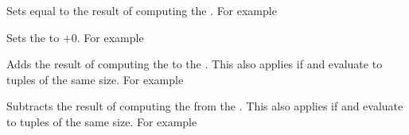 \documentclass[oneside]{book}
\begin{document}
\begin{function}{\FpSet}
\begin{syntax}
  
\end{syntax}
Sets  equal to the result of computing the
. For example
\begin{demohigh}
\FpSet{}
\FpUse\lTmpaFp
\end{demohigh}
\end{function}

\begin{function}{\FpZero}
\begin{syntax}
 
\end{syntax}
Sets the  to $+0$. For example
\begin{demohigh}
\FpSet{}
\FpZero\lTmpaFp
\FpUse\lTmpaFp
\end{demohigh}
\end{function}

\begin{function}{\FpAdd}
\begin{syntax}
  
\end{syntax}
Adds the result of computing the  to
the .
This also applies if  and  evaluate to tuples of the same size. For example
\begin{demohigh}
\FpSet{}
\FpAdd{}
\FpUse\lTmpaFp
\end{demohigh}
\end{function}

\begin{function}{\FpSub}
\begin{syntax}
  
\end{syntax}
Subtracts the result of computing the  from the .
This also applies if  and  evaluate to tuples of the same size. For example
\begin{demohigh}
\FpSet{}
\FpSub{}
\FpUse\lTmpaFp
\end{demohigh}
\end{function}
\end{document}
